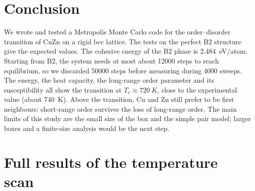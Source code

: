 \documentclass[11pt,a4paper]{article}
\newcommand{\Tc}{T_\mathrm{c}}
\begin{document}
\section{Conclusion}

We wrote and tested a Metropolis Monte Carlo code for the order--disorder transition of CuZn on a rigid bcc lattice.
The tests on the perfect B2 structure give the expected values.
The cohesive energy of the B2 phase is \SI{2.484}{eV/atom}.
Starting from B2, the system needs at most about \num{12000} steps to reach equilibrium, so we discarded \num{50000} steps before measuring during \num{4000} sweeps.
The energy, the heat capacity, the long-range order parameter and its susceptibility all show the transition at $\Tc \approx \SI{720}{K}$, close to the experimental value (about \SI{740}{K}).
Above the transition, Cu and Zn still prefer to be first neighbours: short-range order survives the loss of long-range order.
The main limits of this study are the small size of the box and the simple pair model; larger boxes and a finite-size analysis would be the next step.

\printbibliography[heading=bibintoc, title={References}]

\clearpage
\appendix
\section{Full results of the temperature scan}
\label{app:table}
\end{document}
